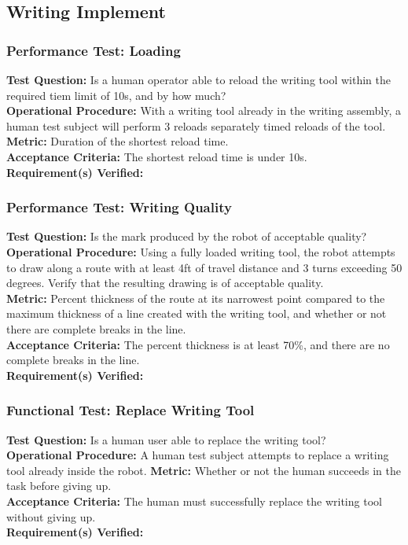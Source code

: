 
\subsection{Writing Implement}
\label{sec:verification_writing_implement}

\subsubsection{Performance Test: Loading}
\label{test:writing_pt_load}
\textbf{Test Question:} Is a human operator able to reload the writing tool within the required tiem limit of 10s, and by how much? \\
\textbf{Operational Procedure:} With a writing tool already in the writing assembly, a human test subject will perform 3 reloads separately timed reloads of the tool. \\
\textbf{Metric:} Duration of the shortest reload time. \\
\textbf{Acceptance Criteria:} The shortest reload time is under 10s. \\
\textbf{Requirement(s) Verified:} 

\subsubsection{Performance Test: Writing Quality}
\label{test:writing_pt_qual}
\textbf{Test Question:} Is the mark produced by the robot of acceptable quality? \\
\textbf{Operational Procedure:} Using a fully loaded writing tool, the robot attempts to draw along a route with at least 4ft of travel distance and 3 turns exceeding 50 degrees. Verify that the resulting drawing is of acceptable quality. \\
\textbf{Metric:} Percent thickness of the route at its narrowest point compared to the maximum thickness of a line created with the writing tool, and whether or not there are complete breaks in the line. \\
\textbf{Acceptance Criteria:} The percent thickness is at least 70\%, and there are no complete breaks in the line. \\
\textbf{Requirement(s) Verified:}  

\subsubsection{Functional Test: Replace Writing Tool}
\label{test:writing_ft_replace}
\textbf{Test Question:} Is a human user able to replace the writing tool? \\
\textbf{Operational Procedure:} A human test subject attempts to replace a writing tool already inside the robot.
\textbf{Metric:} Whether or not the human succeeds in the task before giving up.\\
\textbf{Acceptance Criteria:} The human must successfully replace the writing tool without giving up.  \\
\textbf{Requirement(s) Verified:} 

